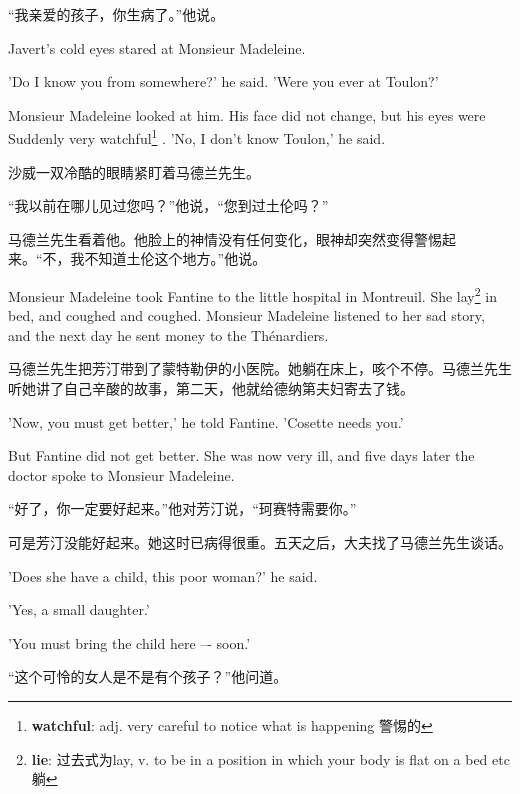 \documentclass[fontset=ubuntu, zihao=5]{ctexart}
\begin{document}
\begin{paracol}{2}
\switchcolumn

“我亲爱的孩子，你生病了。”他说。

\switchcolumn*

Javert's cold eyes stared at Monsieur Madeleine.


'Do I know you from somewhere?' he said. 'Were you ever at Toulon?'


Monsieur Madeleine looked at him. His face did not change, but his eyes were Suddenly very watchful\footnote{\textbf{watchful}: adj. very careful to notice what is happening 警惕的}
. 'No, I don't know Toulon,' he said.

\switchcolumn

沙威一双冷酷的眼睛紧盯着马德兰先生。


“我以前在哪儿见过您吗？”他说，“您到过土伦吗？”


马德兰先生看着他。他脸上的神情没有任何变化，眼神却突然变得警惕起来。“不，我不知道土伦这个地方。”他说。


\switchcolumn*

Monsieur Madeleine took Fantine to the little hospital in Montreuil. She
lay\footnote{\textbf{lie}: 过去式为lay, v. to be in a position in which your body is flat on a bed etc 躺}
 in bed, and coughed and coughed. Monsieur Madeleine listened to her sad story, and the next day he sent money to the Thénardiers.

\switchcolumn

马德兰先生把芳汀带到了蒙特勒伊的小医院。她躺在床上，咳个不停。马德兰先生听她讲了自己辛酸的故事，第二天，他就给德纳第夫妇寄去了钱。

\switchcolumn*

'Now, you must get better,' he told Fantine. 'Cosette needs you.'


But Fantine did not get better. She was now very ill, and five days later the doctor spoke to Monsieur Madeleine.

\switchcolumn

“好了，你一定要好起来。”他对芳汀说，“珂赛特需要你。”


可是芳汀没能好起来。她这时已病得很重。五天之后，大夫找了马德兰先生谈话。

\switchcolumn*

'Does she have a child, this poor woman?' he said.


'Yes, a small daughter.'


'You must bring the child here –- soon.'

\switchcolumn

“这个可怜的女人是不是有个孩子？”他问道。



\end{paracol}
\end{document}

